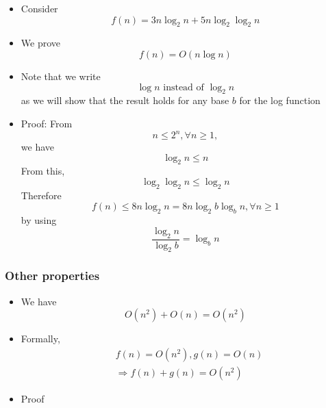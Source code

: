 \begin{frame}[allowframebreaks]
  \begin{itemize}
  \item Consider
    \begin{equation*}
    f(n)=3n \log_2 n + 5n \log_2 \log_2 n
  \end{equation*}
\item We prove
\begin{equation*}
f(n) = O(n\log n)
\end{equation*}
  \item Note that we write
  \begin{equation*}
  \log n \text{ instead of } \log_2 n
\end{equation*}
as we will show that the result holds for
any base $b$ for the log function
\item Proof: From
  \begin{equation*}
    n \leq 2^n, \forall n \geq 1,
  \end{equation*}
we have
\begin{equation*}
   \log_2 n \leq n
\end{equation*}
From this,
\begin{equation*}
 \log_2 \log_2 n \leq \log_2 n 
\end{equation*}
Therefore
\begin{equation*}
 f(n) \leq 8n \log_2 n = 8n\log_2 b\log_b n, \forall n \geq 1 
\end{equation*}
by using
  \begin{equation*}
\frac{ \log_2 n }{ \log_2 b}= \log_b n
\end{equation*}
\end{itemize}\end{frame} \begin{frame}[allowframebreaks] \frametitle{Other properties}
  \begin{itemize}
  \item We have
    \begin{equation*}
    O(n^2) + O(n) = O(n^2)
  \end{equation*}
\item Formally,
  \begin{equation*}
    \begin{split}
      & f(n) = O(n^2), g(n) = O(n)\\
      & \Rightarrow f(n) + g(n) = O(n^2)
    \end{split}
  \end{equation*}
\item Proof
  \begin{equation*}

\end{equation*}
\end{itemize}
\end{frame}

